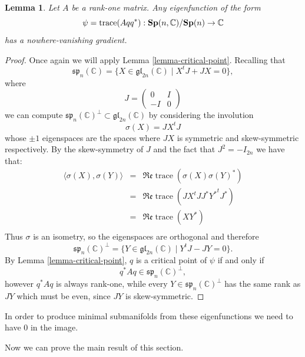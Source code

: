 \documentclass[11pt,reqno]{amsart}
\theoremstyle{plain}
\newtheorem{lemma}        [theorem]  {Lemma}
\theoremstyle{definition}
\numberwithin{equation}{section}
\def \cn{{\mathbb C}}
\def\Re{\mathfrak R\mathfrak e}
\def \glc#1{\mathfrak{gl}_{#1}(\cn)}
\def \Sp#1{\text{\bf Sp}(#1)}
\def \SpC#1{\text{\bf Sp}(#1,\cn)}
\DeclareMathOperator{\trace}{trace}
\numberwithin{equation}{section}
\begin{document}
\begin{lemma}\label{lemma-SP2nC-Submersion}
Let $A$ be a rank-one matrix. Any eigenfunction of the form 
$$ \psi=\trace (A qq^*) :\SpC{n}/\Sp{n} \to \cn$$
has a nowhere-vanishing gradient.
\end{lemma}
\begin{proof}
Once again we will apply Lemma \ref{lemma-critical-point}. Recalling that
$$ \mathfrak{sp}_{n}(\cn) = \{ X \in \glc{2n} \mid X^tJ+JX = 0 \}, $$	
where $$ J = \begin{pmatrix}
	0 & I \\
	-I & 0
\end{pmatrix} $$
we can compute $\mathfrak{sp}_{n}(\cn)^\perp \subset \glc{2n}$ by considering the involution
$$ \sigma(X) = JX^tJ$$
whose $\pm 1$ eigenspaces are the spaces where $JX$ is symmetric and skew-symmetric respectively.
By the skew-symmetry of $J$ and the fact that $J^2 =-I_{2n}$ we have that:
\begin{eqnarray*}
	\langle \sigma(X),\sigma(Y) \rangle &=& \Re \trace ( \sigma(X) \sigma(Y)^*) \\
	&=& \Re \trace ( JX^t J J^* {Y^*}^t J^*) \\
	&=& \Re \trace ( X {Y^*})\\
\end{eqnarray*}
Thus $\sigma$ is an isometry, so the eigenspaces are orthogonal and therefore 
$$ \mathfrak{sp}_{n}(\cn)^\perp = \{ Y \in \glc{2n} \mid Y^tJ-JY = 0 \}.$$	
By Lemma \ref{lemma-critical-point}, $q$ is a critical point of $\psi$ if and only if 
$$ q^* A q \in \mathfrak{sp}_{n}(\cn)^\perp,$$
however $q^* A q$ is always rank-one, while every $Y \in \mathfrak{sp}_{n}(\cn)^\perp$ has the same rank as $JY$ which must be even, since $JY$ is skew-symmetric.
\end{proof}
In order to produce minimal submanifolds from these eigenfunctions we need to have $0$ in the image.

Now we can prove the main result of this section.
\end{document}

